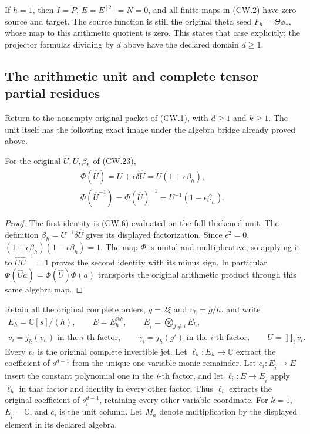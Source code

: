 If \(h=1\), then \(I=P\), \(E=E^{[2]}=N=0\), and all
finite maps in (CW.2) have zero source and target.
The source function is still the original theta seed
\(F_h=\Theta\phi_*\), whose map to this arithmetic quotient
is zero.  This states that case explicitly; the projector
formulas dividing by \(d\) above have the declared domain
\(d\ge1\).

\subsection{The arithmetic unit and complete tensor partial residues}

Return to the nonempty original packet of (CW.1), with
\(d\ge1\) and \(k\ge1\).  The unit itself has the following
exact image under the algebra bridge already proved above.

\begin{corollary}
For the original \(\widehat U,U,\beta_h\) of (CW.23),
\[
 \begin{gathered}
 \Phi(\widehat U)=U+\epsilon\delta\widehat U
                 =U(1+\epsilon\beta_h),\\
 \Phi(\widehat U^{-1})
    =\Phi(\widehat U)^{-1}
    =U^{-1}(1-\epsilon\beta_h).
 \end{gathered}                                                    \tag{CW.41}
\]
\end{corollary}
\begin{proof}
The first identity is (CW.6) evaluated on the full thickened
unit.  The definition \(\beta_h=U^{-1}\delta\widehat U\)
gives its displayed factorization.  Since \(\epsilon^2=0\),
\((1+\epsilon\beta_h)(1-\epsilon\beta_h)=1\).
The map \(\Phi\) is unital and multiplicative, so applying
it to \(\widehat U\widehat U^{-1}=1\) proves the second
identity with its minus sign.  In particular
\(\Phi(\widehat Ua)=\Phi(\widehat U)\Phi(a)\) transports
the original arithmetic product through this same algebra map.
\end{proof}

Retain all the original complete orders, \(g=2\xi\) and
\(v_h=g/h\), and write
\[
 \begin{gathered}
 E_h=\mathbb C[s]/(h),\qquad E=E_h^{\otimes k},\qquad
 E_{\widehat i}=\bigotimes_{j\ne i}E_h,\\
 v_i=j_h(v_h)\text{ in the \(i\)-th factor},\qquad
 \gamma_i=j_h(g')\text{ in the \(i\)-th factor},\qquad
 U=\prod_i v_i .
 \end{gathered}
\]
Every \(v_i\) is the original complete invertible jet.
Let \(\ell_h:E_h\to\mathbb C\) extract the coefficient of
\(s^{d-1}\) from the unique one-variable monic remainder.
Let \(c_i:E_{\widehat i}\to E\) insert the constant polynomial
one in the \(i\)-th factor, and let
\(\ell_i:E\to E_{\widehat i}\) apply \(\ell_h\) in that
factor and identity in every other factor.
Thus \(\ell_i\) extracts the original coefficient of
\(s_i^{d-1}\), retaining every other-variable coordinate.
For \(k=1\), \(E_{\widehat i}=\mathbb C\), and \(c_i\)
is the unit column.  Let \(M_a\) denote multiplication by
the displayed element in its declared algebra.


